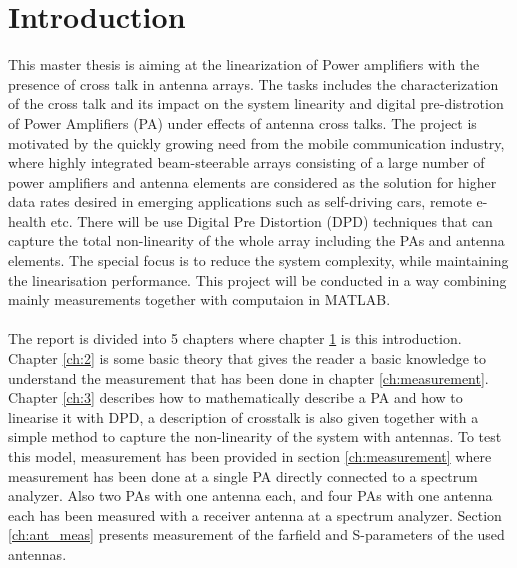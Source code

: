 \chapter{Introduction}\label{ch:introduction}

This master thesis is aiming at the linearization of Power amplifiers with the presence of cross talk in antenna arrays. The tasks includes the characterization of the cross talk and its impact on the system linearity and digital pre-distrotion of Power Amplifiers (PA) under effects of antenna cross talks. The project is motivated by the quickly growing need from the mobile communication industry, where highly integrated beam-steerable arrays consisting of a large number of power amplifiers and antenna elements are considered as the solution for higher data rates desired in emerging applications such as self-driving cars, remote e-health etc. There will be use Digital Pre Distortion (DPD) techniques that can capture the total non-linearity of the whole array including the PAs and antenna elements. The special focus is to reduce the system complexity, while maintaining the linearisation performance. This project will be conducted in a way combining mainly measurements together with computaion in MATLAB.
\\
\\
The report is divided into 5 chapters where chapter \ref{ch:introduction} is this introduction. Chapter \ref{ch:2} is some basic theory that gives the reader a basic knowledge to understand the measurement that has been done in chapter \ref{ch:measurement}. Chapter \ref{ch:3} describes how to mathematically describe a PA and how to linearise it with DPD, a description of crosstalk is also given together with a simple method to capture the non-linearity of the system with antennas. To test this model, measurement has been provided in section \ref{ch:measurement} where measurement has been done at a single PA directly connected to a spectrum analyzer. Also two PAs with one antenna each, and four PAs with one antenna each has been measured with a receiver antenna at a spectrum analyzer. Section \ref{ch:ant_meas} presents measurement of the farfield and S-parameters of the used antennas.    


